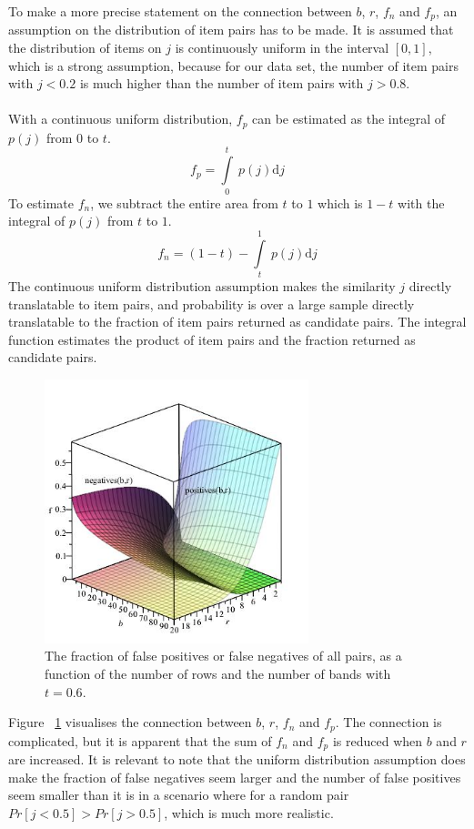 To make a more precise statement on the connection between \(b\), \(r\), \(f_n\) and \(f_p\), an assumption on the distribution of item pairs has to be made. It is assumed that the distribution of items on \(j\) is continuously uniform in the interval \([0, 1]\), which is a strong assumption, because for our data set, the number of item pairs with \(j<0.2\) is much higher than the number of item pairs with \(j>0.8\).\\ \\
With a continuous uniform distribution, \(f_p\) can be estimated as the integral of \(p(j)\) from 0 to \(t\).
\[f_p = \int\limits_0^t\ p(j)\mathrm{d}j\]
To estimate \(f_n\), we subtract the entire area from \(t\) to \(1\) which is \(1-t\) with the integral of \(p(j)\) from \(t\) to \(1\).
\[f_n = (1-t)-\int\limits_t^1\ p(j)\mathrm{d}j\]
The continuous uniform distribution assumption makes the similarity \(j\) directly translatable to item pairs, and probability is over a large sample directly translatable to the fraction of item pairs returned as candidate pairs. The integral function estimates the product of item pairs and the fraction returned as candidate pairs.

\begin{figure}[H]
	\centering
	\includegraphics[width=290px]{img/falseGraph.jpg}
	\caption{The fraction of false positives or false negatives of all pairs, as a function of the number of rows and the number of bands with \(t=0.6\).}
	\label{fig:false_graph}
\end{figure}

Figure ~\ref{fig:false_graph} visualises the connection between \(b\), \(r\), \(f_n\) and \(f_p\). The connection is complicated, but it is apparent that the sum of \(f_n\) and \(f_p\) is reduced when \(b\) and \(r\) are increased. It is relevant to note that the uniform distribution assumption does make the fraction of false negatives seem larger and the number of false positives seem smaller than it is in a scenario where for a random pair \(Pr[j<0.5] > Pr[j>0.5]\), which is much more realistic.
\\
\\

